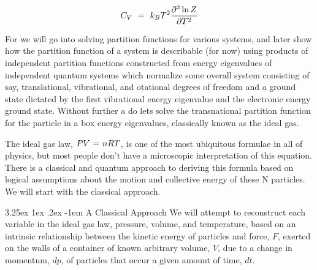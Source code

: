 \documentclass{article}
\makeatletter
\newcounter{subsubsubsection}[subsubsection]
\renewcommand\subparagraph{\@startsection{subparagraph}{6}{\parindent}%
  {3.25ex \@plus1ex \@minus .2ex}%
  {-1em}%
  {\normalfont\normalsize\bfseries}}
\makeatother
\begin{document}
\begin{equation} \label{eb-eq-256-63}
C_V \hspace{0.125cm} = \hspace{0.125cm} k_B T^2 \frac{\partial^2 \ln{Z}}{\partial{T}^2}
\end{equation}

For we will go into solving partition functions for various systems, and later show how the partition function of a system is describable (for now) using products of independent partition functions constructed from energy eigenvalues of independent quantum systems which normalize some overall system consisting of say, translational, vibrational, and otational degrees of freedom and a ground state dictated by the first vibrational energy eigenvalue and the electronic energy ground state. Without further a do lets solve the transnational partition function for the particle in a box energy eigenvalues, classically known as the ideal gas. 

The ideal gas law, \begin{math} P V \hspace{0.025cm} = \hspace{0.025cm} n R T \end{math}, is one of the most ubiquitous formulae in all of physics, but most people don't have a microscopic interpretation of this equation. There is a classical and quantum approach to deriving this formula based on logical assumptions about the motion and collective energy of these N particles. We will start with the classical approach. 

\subparagraph{A Classical Approach}
We will attempt to reconstruct each variable in the ideal gas law, pressure, volume, and temperature, based on an intrinsic relationship between the kinetic energy of particles and force, \begin{math} F \end{math}, exerted on the walls of a container of known arbitrary volume, \begin{math} V \end{math}, due to a change in momentum, \begin{math} dp \end{math}, of particles that occur a given amount of time, \begin{math} dt \end{math}.

\vspace{0.25cm}
\end{document}

